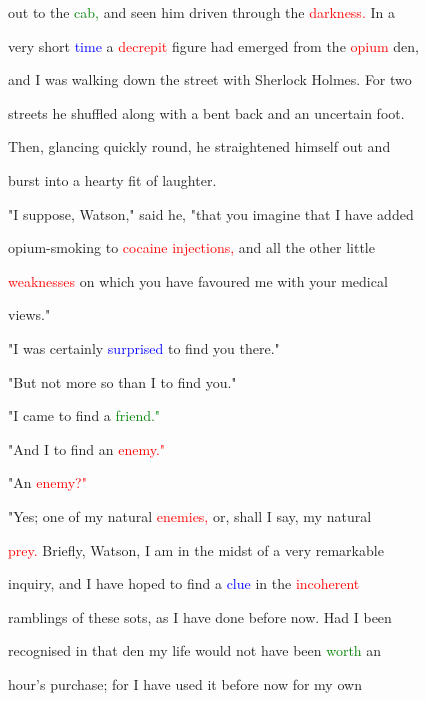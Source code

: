  out to the \textcolor{green}{cab,} and seen him driven through the \textcolor{red}{darkness.} In a

 very short \textcolor{blue}{time} a \textcolor{red}{decrepit} figure had emerged from the \textcolor{red}{opium} den,

 and I was walking down the street with Sherlock Holmes. For two

 streets he shuffled along with a bent back and an \textcolor{BurntOrange}{uncertain} foot.

 Then, glancing quickly round, he straightened himself out and

 burst into a hearty fit of \textcolor{BurntOrange}{laughter.}



 "I suppose, Watson," said he, "that you imagine that I have added

 opium-smoking to \textcolor{red}{cocaine} \textcolor{red}{injections,} and all the other little

 \textcolor{red}{weaknesses} on which you have favoured me with your \textcolor{BurntOrange}{medical}

 views."



 "I was certainly \textcolor{blue}{surprised} to find you there."



 "But not more so than I to find you."



 "I came to find a \textcolor{green}{friend."}



 "And I to find an \textcolor{red}{enemy."}



 "An \textcolor{red}{enemy?"}



 "Yes; one of my natural \textcolor{red}{enemies,} or, shall I say, my natural

 \textcolor{red}{prey.} Briefly, Watson, I am in the midst of a very \textcolor{BurntOrange}{remarkable}

 \textcolor{BurntOrange}{inquiry,} and I have hoped to find a \textcolor{blue}{clue} in the \textcolor{red}{incoherent}

 ramblings of these sots, as I have done before now. Had I been

 recognised in that den my life would not have been \textcolor{green}{worth} an

 hour's purchase; for I have used it before now for my own

